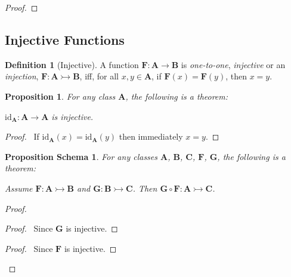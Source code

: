 \documentclass{book}
\let\qed\relax
\newtheorem{prop}[ax]{Proposition}
\newtheorem{props}[ax]{Proposition Schema}
\theoremstyle{definition}
\newtheorem{df}[ax]{Definition}
\newcommand{\id}[1]{\ensuremath{\mathrm{id}_{#1}}}
\begin{document}
\begin{proof}
\pf
{}
\qed
\end{proof}

\subsection{Injective Functions}

\begin{df}[Injective]
A function $\mathbf{F} : \mathbf{A} \rightarrow \mathbf{B}$ is \emph{one-to-one}, \emph{injective} or an \emph{injection}, $\mathbf{F} : \mathbf{A} \rightarrowtail \mathbf{B}$, iff, for all $x,y \in \mathbf{A}$, if $\mathbf{F}(x) = \mathbf{F}(y)$, then $x = y$.
\end{df}

\begin{prop}
\label{prop:idinj}
For any class $\mathbf{A}$, the following is a theorem:

$\id{\mathbf{A}} : \mathbf{A} \rightarrow \mathbf{A}$ is injective.
\end{prop}

\begin{proof}
\pf\ If $\id{\mathbf{A}}(x) = \id{\mathbf{A}}(y)$ then immediately $x = y$. \qed
\end{proof}

\begin{props}
\label{prop:compinj}
For any classes $\mathbf{A}$, $\mathbf{B}$, $\mathbf{C}$, $\mathbf{F}$, $\mathbf{G}$, the following is a theorem:

Assume $\mathbf{F} : \mathbf{A} \rightarrowtail \mathbf{B}$ and $\mathbf{G} : \mathbf{B} \rightarrowtail \mathbf{C}$. Then $\mathbf{G} \circ \mathbf{F} : \mathbf{A} \rightarrowtail \mathbf{C}$.
\end{props}

\begin{proof}
\pf
{}
\begin{proof}
	\pf\ Since $\mathbf{G}$ is injective.
\end{proof}
\begin{proof}
	\pf\ Since $\mathbf{F}$ is injective.
\end{proof}
\qed
\end{proof}
\end{document}
